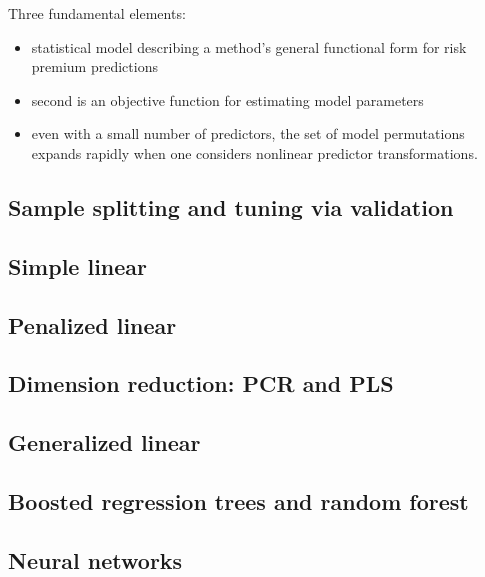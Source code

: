 \documentclass[12pt,a4paper,oneside]{book}
\begin{document}
	
Three fundamental elements:
\begin{itemize}
\item statistical model describing a method’s general functional form for risk premium
predictions
\item second is an objective function for estimating model parameters
\item even with a small number of predictors, the set of model permutations expands rapidly when one considers nonlinear predictor
transformations.
\end{itemize}

\subsection{Sample splitting and tuning via validation}
\subsection{Simple linear}
\subsection{Penalized linear}
\subsection{Dimension reduction: PCR and PLS}
\subsection{Generalized linear}
\subsection{Boosted regression trees and random forest}
\subsection{Neural networks}
	
	
\end{document}
